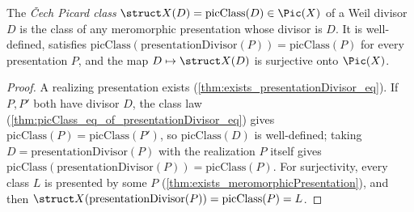 \begin{definition}
  \label{def:curveDivisor_picClass}
  \leanok
  The \emph{\v Cech Picard class} \(\struct X(D) = \mathrm{picClass}(D) \in \Pic(X)\) of a Weil
  divisor \(D\) is the class of any meromorphic presentation whose divisor is \(D\). It is
  well-defined, satisfies \(\mathrm{picClass}(\mathrm{presentationDivisor}(P)) = \mathrm{picClass}(P)\)
  for every presentation \(P\), and the map \(D \mapsto \struct X(D)\) is surjective onto
  \(\Pic(X)\).
\end{definition}
\begin{proof}
  \leanok
  A realizing presentation exists (\ref{thm:exists_presentationDivisor_eq}). If \(P, P'\) both have
  divisor \(D\), the class law (\ref{thm:picClass_eq_of_presentationDivisor_eq}) gives
  \(\mathrm{picClass}(P) = \mathrm{picClass}(P')\), so \(\mathrm{picClass}(D)\) is well-defined;
  taking \(D = \mathrm{presentationDivisor}(P)\) with the realization \(P\) itself gives
  \(\mathrm{picClass}(\mathrm{presentationDivisor}(P)) = \mathrm{picClass}(P)\). For surjectivity,
  every class \(L\) is presented by some \(P\) (\ref{thm:exists_meromorphicPresentation}), and then
  \(\struct X(\mathrm{presentationDivisor}(P)) = \mathrm{picClass}(P) = L\).
\end{proof}


